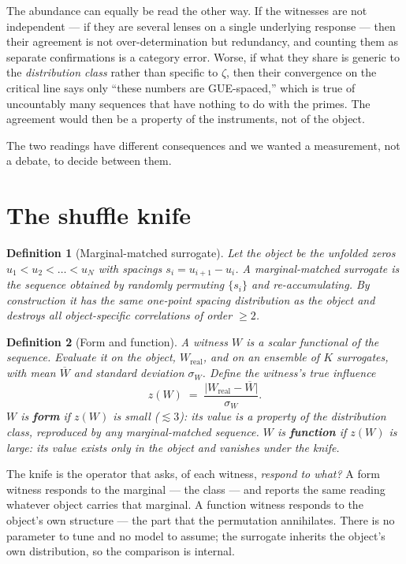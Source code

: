 \documentclass[11pt]{article}
\newtheorem{definition}{Definition}
\begin{document}
The abundance can equally be read the other way. If the witnesses are not independent --- if they are several lenses on a single underlying response --- then their agreement is not over-determination but redundancy, and counting them as separate confirmations is a category error. Worse, if what they share is generic to the \emph{distribution class} rather than specific to $\zeta$, then their convergence on the critical line says only ``these numbers are GUE-spaced,'' which is true of uncountably many sequences that have nothing to do with the primes. The agreement would then be a property of the instruments, not of the object.

The two readings have different consequences and we wanted a measurement, not a debate, to decide between them.

\section{The shuffle knife}\label{sec:knife}

\begin{definition}[Marginal-matched surrogate]
Let the object be the unfolded zeros $u_1<u_2<\dots<u_N$ with spacings $s_i=u_{i+1}-u_i$. A \emph{marginal-matched surrogate} is the sequence obtained by randomly permuting $\{s_i\}$ and re-accumulating. By construction it has the \emph{same} one-point spacing distribution as the object and destroys all object-specific correlations of order $\ge2$.
\end{definition}

\begin{definition}[Form and function]\label{def:ff}
A witness $W$ is a scalar functional of the sequence. Evaluate it on the object, $W_{\mathrm{real}}$, and on an ensemble of $K$ surrogates, with mean $\overline{W}$ and standard deviation $\sigma_W$. Define the witness's \emph{true influence}
\[
z(W)\;=\;\frac{\big|W_{\mathrm{real}}-\overline{W}\big|}{\sigma_W}.
\]
$W$ is \textbf{form} if $z(W)$ is small ($\lesssim3$): its value is a property of the distribution class, reproduced by any marginal-matched sequence. $W$ is \textbf{function} if $z(W)$ is large: its value exists only in the object and vanishes under the knife.
\end{definition}

The knife is the operator that asks, of each witness, \emph{respond to what?} A form witness responds to the marginal --- the class --- and reports the same reading whatever object carries that marginal. A function witness responds to the object's own structure --- the part that the permutation annihilates. There is no parameter to tune and no model to assume; the surrogate inherits the object's own distribution, so the comparison is internal.
\end{document}
